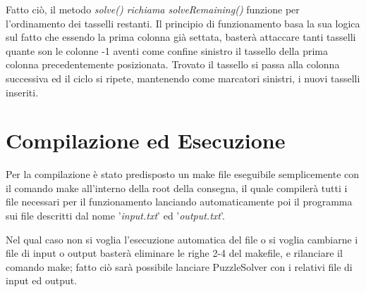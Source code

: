 \documentclass[11pt]{article}
\begin{document}
Fatto ciò, il metodo \textit{solve() \emph{richiama} solveRemaining()} funzione per l'ordinamento dei tasselli restanti.
Il principio di funzionamento basa la sua logica sul fatto che essendo la prima colonna già settata, basterà attaccare tanti tasselli quante son le colonne -1 aventi come confine sinistro il tassello della prima colonna precedentemente posizionata. Trovato il tassello si passa alla colonna successiva ed il ciclo si ripete, mantenendo come marcatori sinistri, i nuovi tasselli inseriti.
\section{Compilazione ed Esecuzione}
Per la compilazione è stato predisposto un make file eseguibile semplicemente con il comando make all'interno della root della consegna, il quale compilerà tutti i file necessari per il funzionamento lanciando automaticamente poi il programma sui file descritti dal nome '\textit{input.txt}' ed '\textit{output.txt}'. 

Nel qual caso non si voglia l'esecuzione automatica del file o si voglia cambiarne i file di input o output basterà eliminare le righe 2-4 del makefile, e rilanciare il comando make; fatto ciò sarà possibile lanciare PuzzleSolver con i relativi file di input ed output.
\end{document}
